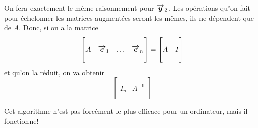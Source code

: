 \documentclass[a4paper]{article}
\begin{document}
{    On fera exactement le même raisonnement pour $\bm{\protect\overrightarrow{y}}_2$. Les opérations qu'on fait pour échelonner les matrices augmentées seront les mêmes, ils ne dépendent que de $A$. Donc, si on a la matrice
    \[ \begin{bmatrix}  &  &  &  \\ A & \bm{\protect\overrightarrow{e}}_1 & \ldots & \bm{\protect\overrightarrow{e}}_n \\  &  &  &  \end{bmatrix} = \begin{bmatrix}  &  \\ A & I \\  &  \end{bmatrix} \]
    et qu'on la réduit, on va obtenir
    \[\begin{bmatrix}  &  \\ I_n & A^{-1} \\  &  \end{bmatrix} \]

    Cet algorithme n'est pas forcément le plus efficace pour un ordinateur, mais il fonctionne!
}
\end{document}
